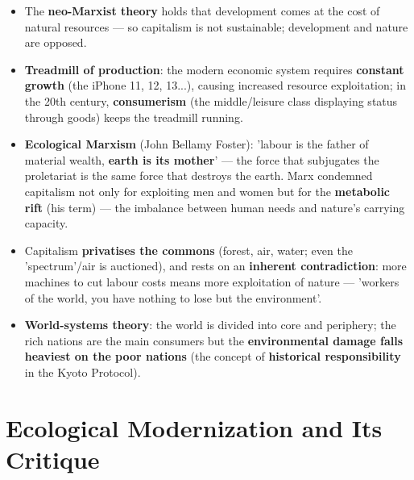 \begin{KeyConcept}
\begin{itemize}
\item The \textbf{neo-Marxist theory} holds that development comes at the cost of natural resources --- so capitalism is not sustainable; development and nature are opposed.
\item \textbf{Treadmill of production}: the modern economic system requires \textbf{constant growth} (the iPhone 11, 12, 13...), causing increased resource exploitation; in the 20th century, \textbf{consumerism} (the middle/leisure class displaying status through goods) keeps the treadmill running.
\item \textbf{Ecological Marxism} (John Bellamy Foster): 'labour is the father of material wealth, \textbf{earth is its mother}' --- the force that subjugates the proletariat is the same force that destroys the earth. Marx condemned capitalism not only for exploiting men and women but for the \textbf{metabolic rift} (his term) --- the imbalance between human needs and nature's carrying capacity.
\item Capitalism \textbf{privatises the commons} (forest, air, water; even the 'spectrum'/air is auctioned), and rests on an \textbf{inherent contradiction}: more machines to cut labour costs means more exploitation of nature --- 'workers of the world, you have nothing to lose but the environment'.
\item \textbf{World-systems theory}: the world is divided into core and periphery; the rich nations are the main consumers but the \textbf{environmental damage falls heaviest on the poor nations} (the concept of \textbf{historical responsibility} in the Kyoto Protocol).
\end{itemize}
\end{KeyConcept}

\section{Ecological Modernization and Its Critique}

